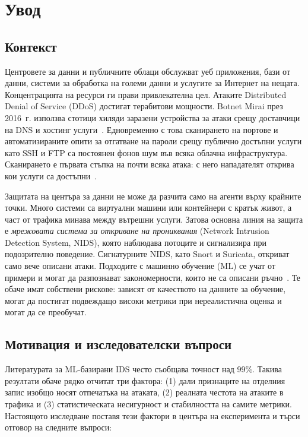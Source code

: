 \chapter*{Увод}

\section*{Контекст}
Центровете за данни и публичните облаци обслужват уеб приложения, бази от данни, системи за обработка на големи данни и услугите за Интернет на нещата. Концентрацията на ресурси ги прави привлекателна цел. Атаките Distributed Denial of Service (DDoS) достигат терабитови мощности. Botnet Mirai през 2016~г. използва стотици хиляди заразени устройства за атаки срещу доставчици на DNS и хостинг услуги~\cite{antonakakis2017}. Едновременно с това сканирането на портове и автоматизираните опити за отгатване на пароли срещу публично достъпни услуги като SSH и FTP са постоянен фонов шум във всяка облачна инфраструктура. Сканирането е първата стъпка на почти всяка атака: с него нападателят открива кои услуги са достъпни~\cite{lyon2009}.

Защитата на центъра за данни не може да разчита само на агенти върху крайните точки. Много системи са виртуални машини или контейнери с кратък живот, а част от трафика минава между вътрешни услуги. Затова основна линия на защита е \emph{мрежовата система за откриване на прониквания} (Network Intrusion Detection System, NIDS), която наблюдава потоците и сигнализира при подозрително поведение. Сигнатурните NIDS, като Snort и Suricata, откриват само вече описани атаки. Подходите с машинно обучение (ML) се учат от примери и могат да разпознават закономерности, които не са описани ръчно~\cite{sommer2010,buczak2016}. Те обаче имат собствени рискове: зависят от качеството на данните за обучение, могат да постигат подвеждащо високи метрики при нереалистична оценка и могат да се преобучат.

\section*{Мотивация и изследователски въпроси}
Литературата за ML-базирани IDS често съобщава точност над 99\%. Такива резултати обаче рядко отчитат три фактора: (1) дали признаците на отделния запис изобщо носят отпечатъка на атаката, (2) реалната честота на атаките в трафика и (3) статистическата несигурност и стабилността на самите метрики. Настоящото изследване поставя тези фактори в центъра на експеримента и търси отговор на следните въпроси:

